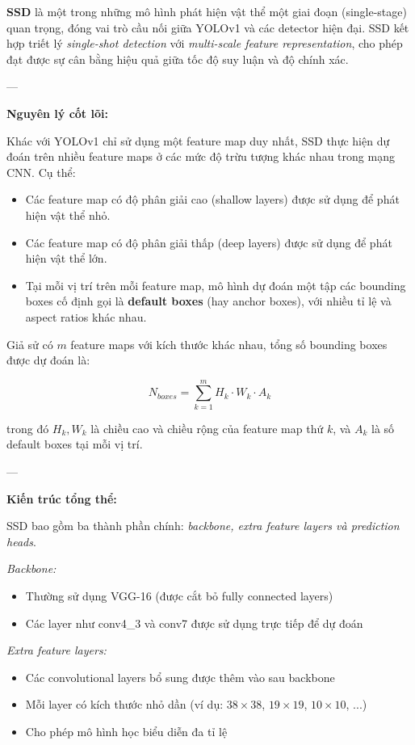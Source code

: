 \textbf{SSD} \cite{Liu2016} là một trong những mô hình phát hiện vật thể một giai đoạn (single-stage) quan trọng, đóng vai trò cầu nối giữa YOLOv1 và các detector hiện đại. SSD kết hợp triết lý \textit{single-shot detection} với \textit{multi-scale feature representation}, cho phép đạt được sự cân bằng hiệu quả giữa tốc độ suy luận và độ chính xác.

---

\textbf{Nguyên lý cốt lõi:}

Khác với YOLOv1 chỉ sử dụng một feature map duy nhất, SSD thực hiện dự đoán trên nhiều feature maps ở các mức độ trừu tượng khác nhau trong mạng CNN. Cụ thể:

\begin{itemize}
	\item Các feature map có độ phân giải cao (shallow layers) được sử dụng để phát hiện vật thể nhỏ.
	\item Các feature map có độ phân giải thấp (deep layers) được sử dụng để phát hiện vật thể lớn.
	\item Tại mỗi vị trí trên mỗi feature map, mô hình dự đoán một tập các bounding boxes cố định gọi là \textbf{default boxes} (hay anchor boxes), với nhiều tỉ lệ và aspect ratios khác nhau.
\end{itemize}

Giả sử có $m$ feature maps với kích thước khác nhau, tổng số bounding boxes được dự đoán là:

\begin{equation}
	N_{boxes} = \sum_{k=1}^{m} H_k \cdot W_k \cdot A_k
\end{equation}

trong đó $H_k, W_k$ là chiều cao và chiều rộng của feature map thứ $k$, và $A_k$ là số default boxes tại mỗi vị trí.

---

\textbf{Kiến trúc tổng thể:}

SSD bao gồm ba thành phần chính: \textit{backbone, extra feature layers và prediction heads}.

\textit{Backbone:}
\begin{itemize}
	\item Thường sử dụng VGG-16 (được cắt bỏ fully connected layers)
	\item Các layer như conv4\_3 và conv7 được sử dụng trực tiếp để dự đoán
\end{itemize}

\textit{Extra feature layers:}
\begin{itemize}
	\item Các convolutional layers bổ sung được thêm vào sau backbone
	\item Mỗi layer có kích thước nhỏ dần (ví dụ: $38 \times 38$, $19 \times 19$, $10 \times 10$, ...)
	\item Cho phép mô hình học biểu diễn đa tỉ lệ
\end{itemize}

